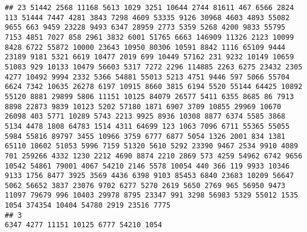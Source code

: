 \documentclass{article}\usepackage[]{graphicx}\usepackage[]{color}
\makeatletter
\newenvironment{kframe}{%
 \def\at@end@of@kframe{}%
 \ifinner\ifhmode%
  \def\at@end@of@kframe{\end{minipage}}%
  \begin{minipage}{\columnwidth}%
 \fi\fi%
 \def\FrameCommand##1{\hskip\@totalleftmargin \hskip-\fboxsep
 \colorbox{shadecolor}{##1}\hskip-\fboxsep
     \hskip-\linewidth \hskip-\@totalleftmargin \hskip\columnwidth}%
 \MakeFramed {\advance\hsize-\width
   \@totalleftmargin\z@ \linewidth\hsize
   \@setminipage}}%
 {\par\unskip\endMakeFramed%
 \at@end@of@kframe}
\newenvironment{knitrout}{}{} %
\makeatother
\begin{document}
\begin{knitrout}
\begin{kframe}
\begin{verbatim}
## 23 51442 2568 11168 5613 1029 3251 10644 2744 81611 467 6566 2824 113 51444 7447 4281 3843 7298 4609 53335 9126 30968 4603 4893 55082 9655 663 9459 23228 9493 6347 28959 2773 5359 5268 4200 9833 55795 7153 4851 7027 858 2961 3832 6001 51765 6663 146909 11326 2123 10099 8428 6722 55872 10000 23643 10950 80306 10591 8842 1116 65109 9444 23189 9181 5321 6619 10477 2019 699 10449 57162 231 9232 10149 10659 51083 929 10133 10479 56603 5317 7272 2296 114885 2263 6275 23432 2305 4277 10492 9994 2332 5366 54881 55013 5213 4751 9446 597 5066 55704 6624 7342 10635 26278 6197 10915 8660 3815 6194 5520 55144 64425 10892 55120 8881 29899 5806 11151 10125 84079 26577 5411 6355 8685 86 7913 8898 22873 9839 10123 5202 57180 1871 6907 3709 10855 29969 10670 26098 403 5771 10289 5743 2213 9925 8936 10308 8877 6374 5585 3868 5134 4478 1808 64783 1514 4311 64699 123 1063 7096 6711 55365 55055 5984 55816 89797 3455 10966 3759 6777 6877 5054 1326 2001 834 1381 65110 10602 51053 5996 7159 51320 5610 5292 23390 9467 2534 9910 4089 701 259266 4332 1230 2212 4690 8874 2210 2869 573 4259 54962 6742 9656 10542 54861 79001 4067 54210 2146 5578 10054 440 366 119 9933 10346 9133 1756 8477 3925 3569 4436 6398 9103 85453 6840 23683 10209 56647 5062 56652 3837 23076 9702 6277 5270 2619 5650 2769 965 56950 9473 11097 79679 996 10403 29978 8795 23347 991 3298 56983 5329 55012 1535 1054 374354 10404 54780 2919 23516 7775
## 3                                                                                                                                                                                                                                                                                                                                                                                                                                                                                                                                                                                                                                                                                                                                                                                                                                                                                                                                                                                                                                                                                                                                                                                                                                                                                                                                                                                                                         6347 4277 11151 10125 6777 54210 1054

\end{verbatim}
\end{kframe}
\end{knitrout}
\end{document}
